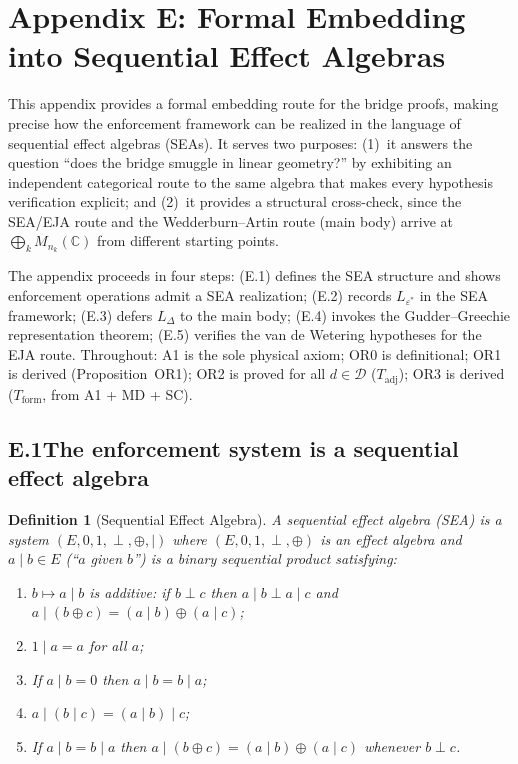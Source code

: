 \documentclass[11pt]{article}
\newtheorem{definition}[theorem]{Definition}
\theoremstyle{remark}
\begin{document}
\section*{Appendix E: Formal Embedding into Sequential Effect Algebras}
\label{app:sea}

This appendix provides a formal embedding route for the bridge proofs, making precise how the enforcement framework can be realized in the language of sequential effect algebras (SEAs).  It serves two purposes: (1)~it answers the question ``does the bridge smuggle in linear geometry?'' by exhibiting an independent categorical route to the same algebra that makes every hypothesis verification explicit; and (2)~it provides a structural cross-check, since the SEA/EJA route and the Wedderburn--Artin route (main body) arrive at $\bigoplus_k M_{n_k}(\mathbb{C})$ from different starting points.

The appendix proceeds in four steps: (E.1) defines the SEA structure and shows enforcement operations admit a SEA realization; (E.2) records $L_{\varepsilon^*}$ in the SEA framework; (E.3) defers $L_\Delta$ to the main body; (E.4) invokes the Gudder--Greechie representation theorem; (E.5) verifies the van de Wetering hypotheses for the EJA route.  Throughout: A1 is the sole physical axiom; OR0 is definitional; OR1 is derived (Proposition~OR1); OR2 is proved for all $d \in \mathcal{D}$ ($T_{\mathrm{adj}}$); OR3 is derived ($T_{\mathrm{form}}$, from A1 + MD + SC).

\subsection*{E.1\quad The enforcement system is a sequential effect algebra}

\begin{definition}[Sequential Effect Algebra]
\label{def:sea}
A \emph{sequential effect algebra} (SEA) is a system $(E, 0, 1, \perp, \oplus, \mid)$ where $(E, 0, 1, \perp, \oplus)$ is an effect algebra and $a \mid b \in E$ (``$a$ given $b$'') is a binary sequential product satisfying:
\begin{enumerate}[nosep,leftmargin=2em,itemsep=2pt]
  \item[(S1)] $b \mapsto a \mid b$ is additive: if $b \perp c$ then $a\mid b \perp a\mid c$ and $a \mid (b \oplus c) = (a\mid b) \oplus (a\mid c)$;
  \item[(S2)] $1 \mid a = a$ for all $a$;
  \item[(S3)] If $a \mid b = 0$ then $a \mid b = b \mid a$;
  \item[(S4)] $a \mid (b \mid c) = (a \mid b) \mid c$;
  \item[(S5)] If $a \mid b = b \mid a$ then $a \mid (b \oplus c) = (a \mid b) \oplus (a \mid c)$ whenever $b \perp c$.
\end{enumerate}
\end{definition}
\end{document}
